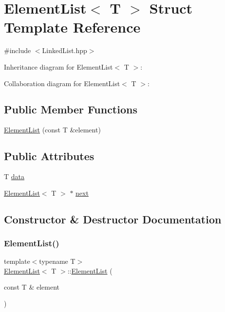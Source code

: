 \hypertarget{struct_element_list}{}\section{Element\+List$<$ T $>$ Struct Template Reference}
\label{struct_element_list}


{\ttfamily \#include $<$Linked\+List.\+hpp$>$}



Inheritance diagram for Element\+List$<$ T $>$\+:


Collaboration diagram for Element\+List$<$ T $>$\+:
\subsection*{Public Member Functions}
\begin{DoxyCompactItemize}
\item 
\mbox{\hyperlink{struct_element_list_a2f2c3bfdd0cda10f2e50f8f04758b52a}{Element\+List}} (const T \&element)
\end{DoxyCompactItemize}
\subsection*{Public Attributes}
\begin{DoxyCompactItemize}
\item 
T \mbox{\hyperlink{struct_element_list_a4c3bbe183d5a854d51e193b21075c884}{data}}
\item 
\mbox{\hyperlink{struct_element_list}{Element\+List}}$<$ T $>$ $\ast$ \mbox{\hyperlink{struct_element_list_ae15f34d3109949237cf3ba98a074d402}{next}}
\end{DoxyCompactItemize}


\subsection{Constructor \& Destructor Documentation}
\mbox{\label{struct_element_list_a2f2c3bfdd0cda10f2e50f8f04758b52a}} 
\subsubsection{\texorpdfstring{Element\+List()}{ElementList()}}
{\footnotesize\ttfamily template$<$typename T$>$ \\
\mbox{\hyperlink{struct_element_list}{Element\+List}}$<$ T $>$\+::\mbox{\hyperlink{struct_element_list}{Element\+List}} (\begin{DoxyParamCaption}\item[{const T \&}]{element }\end{DoxyParamCaption})\hspace{0.3cm}{\ttfamily [inline]}}



